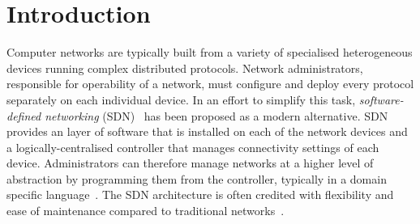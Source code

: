 

\newcommand{\souffle}{Souffl\'{e}\xspace}
\newcommand{\vampire}{Vampire\xspace}
\newcommand{\eprover}{E\xspace}
\newcommand{\spass}{Spass\xspace}


\newcommand{\Datalog}{Datalog\xspace}

\newcommand*{\rl}{\mathrel{\leftarrow}}
\newcommand*{\comma}{\mathrel{\wedge}}

\renewcommand*{\phi}{\varphi}

\newcommand{\typedRel}[1]{\mathit{#1}}
\newcommand{\typed}[2]{\typedRel{#1}({#2})}

\newcommand{\pred}[1]{\mathit{#1}} %
\newcommand{\const}[1]{\mathrm{#1}} %
\newcommand{\type}[1]{\mathrm{#1}} %

\newcommand{\sem}[1]{(#1)} %

\section{Introduction}
\label{sect:aws/introduction}
Computer networks are typically built from a variety of specialised heterogeneous devices running complex distributed protocols. Network administrators, responsible for operability of a network, must configure and deploy every protocol separately on each individual device. In an effort to simplify this task, \emph{software-defined networking} (SDN)~\cite{SDN} has been proposed as a modern alternative. SDN provides an layer of software that is installed on each of the network devices and a logically-centralised controller that manages connectivity settings of each device. Administrators can therefore manage networks at a higher level of abstraction by programming them from the controller, typically in a domain specific language~\cite{DBLP:journals/cm/FosterGRSFKMRRSWH13}. The SDN architecture is often credited with flexibility and ease of maintenance compared to traditional networks~\cite{benzekki2016software}.

